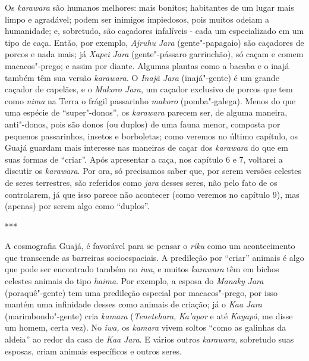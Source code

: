 Os \emph{karawara} são humanos melhores: mais bonitos; habitantes de um
lugar mais limpo e agradável; podem ser inimigos impiedosos, pois muitos
odeiam a humanidade; e, sobretudo, são caçadores infalíveis - cada um
especializado em um tipo de caça. Então, por exemplo, \emph{Ajruhu}
\emph{Jara} (gente"-papagaio) são caçadores de porcos e nada mais; já
\emph{Xapei Jara} (gente"-pássaro garrinchão), só caçam e comem
macacos"-prego; e assim por diante. Algumas plantas como a bacaba e o
inajá também têm sua versão \emph{karawara}. O \emph{Inajã Jara}
(inajá"-gente) é um grande caçador de capelães, e o \emph{Makoro Jara},
um caçador exclusivo de porcos que tem como \emph{nima} na Terra o
frágil passarinho \emph{makoro} (pomba"-galega). Menos do que uma espécie
de ``super"-donos'', os \emph{karawara} parecem ser, de alguma maneira,
anti"-donos, pois são donos (ou duplos) de uma fauna menor, composta por
pequenos passarinhos, insetos e borboletas; como veremos no último
capítulo, os Guajá guardam mais interesse nas maneiras de caçar dos
\emph{karawara} do que em suas formas de ``criar''. Após apresentar a
caça, nos capítulo 6 e 7, voltarei a discutir os \emph{karawara}. Por
ora, só precisamos saber que, por serem versões celestes de seres
terrestres, são referidos como \emph{jara} desses seres, não pelo fato
de os controlarem, já que isso parece não acontecer (como veremos no
capítulo 9), mas (apenas) por serem algo como ``duplos''.

\begin{center}
***
\end{center}

A cosmografia Guajá, é favorável para se pensar o \emph{riku} como um
acontecimento que transcende as barreiras socioespaciais. A predileção
por ``criar'' animais é algo que pode ser encontrado também no \emph{iwa},
e muitos \emph{karawara} têm em bichos celestes animais do tipo
\emph{haima}. Por exemplo, a esposa do \emph{Manaky} \emph{Jara}
(poraquê"-gente) tem uma predileção especial por macacos"-prego, por isso
mantém uma infinidade desses como animais de criação; já o \emph{Kaa
Jara} (marimbondo"-gente) cria \emph{kamara} (\emph{Tenetehara},
\emph{Ka'apor} e até \emph{Kayapó}, me disse um homem, certa vez). No
\emph{iwa,} os \emph{kamara} vivem soltos ``como as galinhas da aldeia''
ao redor da casa de \emph{Kaa} \emph{Jara}. E vários outros
\emph{karawara}, sobretudo suas esposas, criam animais específicos e
outros seres.

